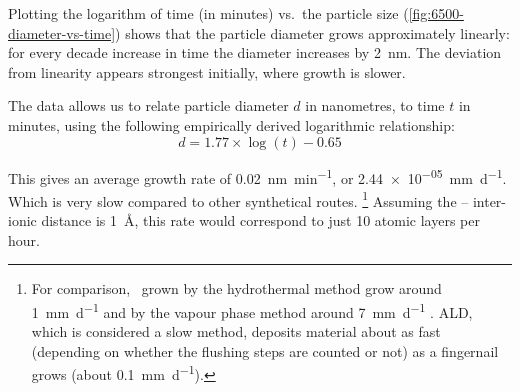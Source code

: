 \documentclass[draft,webedition,openright,titles,swedish,english]{LuaUUThesis}\usepackage[]{graphicx}\usepackage[]{xcolor}
\newcommand{\vs}{vs.}
\begin{document}
Plotting the logarithm of time (in minutes) \vs\ the particle size (\cref{fig:6500-diameter-vs-time})
shows that the particle diameter grows approximately linearly: for every decade
increase in time the diameter increases by \qty{2}{\nm}.
The deviation from linearity appears strongest initially, where growth is slower.

The data allows us to relate particle diameter $d$ in nanometres, to time $t$ in minutes,
using the following empirically derived logarithmic relationship:
\begin{equation}
d = 1.77 \times
   \log(t) - 0.65
\end{equation}

This gives an average growth rate of
\qty[per-mode=symbol]{0.02}{\nm\per\minute},
or
\qty[per-mode=symbol]{2.44e-05}{\mm\per\day}.
Which is very slow compared to other synthetical routes.%
\footnote{%
   For comparison, \ZnO\ grown by the hydrothermal method
   grow around \qty[per-mode=symbol]{1}{\mm\per\day}
   and by the vapour phase method around \qty[per-mode=symbol]{7}{\mm\per\day}
   \cite{Jacobs2010,Schulz2008}.
   \Gls{ALD}, which is considered a slow method, deposits material
   about as fast (depending on whether the flushing steps are counted or not)
   as a fingernail grows (about \qty{0.1}{\mm\per\day}).
}
Assuming the -- inter-ionic distance is \qty{1}{\angstrom},
this rate would correspond to just \num{10} atomic layers per hour.


\clearpage
%

%




































%
\end{document}
